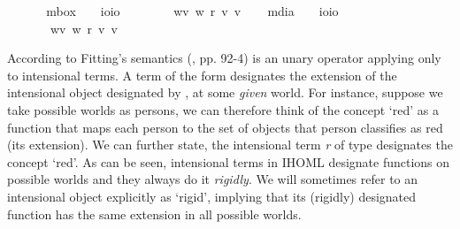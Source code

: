 \begin{isabellebody}
\isanewline
\ \ \isanewline
\ \ \isamarkupfalse%
\ mbox\ \ \ {\isacharcolon}{\isacharcolon}\ {\isachardoublequoteopen}io{\isasymRightarrow}io{\isachardoublequoteclose}\ {\isacharparenleft}{\isachardoublequoteopen}\isanewline
\ \ \ \ \ {\isachardoublequoteopen}\isactrlbold {\isasymbox}{\isasymphi}\ {\isasymequiv}\ {\isasymlambda}w{\isachardot}{\isasymforall}v{\isachardot}\ {\isacharparenleft}w\ r\ v{\isacharparenright}{\isasymlongrightarrow}{\isacharparenleft}{\isasymphi}\ v{\isacharparenright}{\isachardoublequoteclose}\isanewline
\ \ \isamarkupfalse%
\ mdia\ \ \ {\isacharcolon}{\isacharcolon}\ {\isachardoublequoteopen}io{\isasymRightarrow}io{\isachardoublequoteclose}\ {\isacharparenleft}{\isachardoublequoteopen}\isanewline
\ \ \ \ \ {\isachardoublequoteopen}\isactrlbold {\isasymdiamond}{\isasymphi}\ {\isasymequiv}\ {\isasymlambda}w{\isachardot}{\isasymexists}v{\isachardot}\ {\isacharparenleft}w\ r\ v{\isacharparenright}{\isasymand}{\isacharparenleft}{\isasymphi}\ v{\isacharparenright}{\isachardoublequoteclose}%
\isamarkuptrue%
%
\begin{isamarkuptext}%
According to Fitting's semantics (\cite{Fitting}, pp. 92-4) \isa{{\isasymdown}} is an unary operator applying only to 
 intensional terms. A term of the form \isa{{\isasymdown}{\isasymalpha}} designates the extension of the intensional object designated by 
 \isa{{\isasymalpha}}, at some \emph{given} world. For instance, suppose we take possible worlds as persons,
 we can therefore think of the concept `red' as a function that maps each person to the set of objects that person
 classifies as red (its extension). We can further state, the intensional term \emph{r} of type \isa{{\isasymup}{\isasymlangle}{\isasymzero}{\isasymrangle}} designates the concept `red'.
 As can be seen, intensional terms in IHOML designate functions on possible worlds and they always do it \emph{rigidly}. 
 We will sometimes refer to an intensional object explicitly as `rigid', implying that its (rigidly) designated function has
 the same extension in all possible worlds.%

\end{isamarkuptext}
\end{isabellebody}
